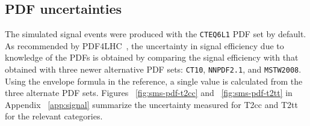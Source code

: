 \subsection{PDF uncertainties\label{sec:pdf-sets}}

The simulated signal events were produced with the \verb!CTEQ6L1! PDF
set by default.  As recommended by PDF4LHC~\cite{pdf4lhc}, the uncertainty
in signal efficiency due to knowledge of the PDFs is obtained by comparing 
the signal efficiency with that obtained with three newer alternative PDF 
sets: \verb!CT10!, \verb!NNPDF2.1!, and \verb!MSTW2008!. Using the envelope
formula in the reference, a single value is calculated from the three alternate
PDF sets. Figures ~\ref{fig:sms-pdf-t2cc} and ~\ref{fig:sms-pdf-t2tt} in Appendix
 ~\ref{app:signal} summarize the uncertainty measured for T2cc and T2tt 
for the relevant categories. 

